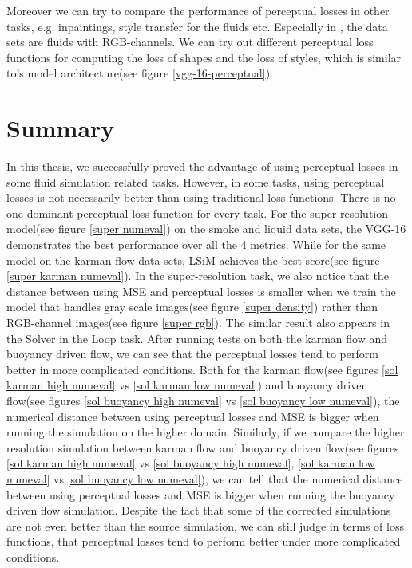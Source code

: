\documentclass[a4paper,12pt,twoside]{report}
\begin{document}
Moreover we can try to compare the performance of perceptual losses in other tasks, e.g. inpaintings\cite{DBLP:journals/corr/abs-1712-03111}, style transfer for the fluids\cite{kim2020lagrangian} etc. Especially in \cite{kim2020lagrangian}, the data sets are fluids with RGB-channels. We can try out different perceptual loss functions for computing the loss of shapes and the loss of styles, which is similar to\cite{johnson2016perceptual}'s model architecture(see figure \ref{vgg-16-perceptual}).
\section{Summary}
In this thesis, we successfully proved the advantage of using perceptual losses in some fluid simulation related tasks. However, in some tasks, using perceptual losses is not necessarily better than using traditional loss functions. There is no one dominant perceptual loss function for every task. For the super-resolution model(see figure \ref{super numeval}) on the smoke and liquid data sets, the VGG-16 demonstrates the best performance over all the 4 metrics. While for the same model on the karman flow data sets, LSiM achieves the best score(see figure \ref{super karman numeval}). 
In the super-resolution task, we also notice that the distance between using MSE and perceptual losses is smaller when we train the model that handles gray scale images(see figure \ref{super density}) rather than RGB-channel images(see figure \ref{super rgb}). The similar result also appears in the Solver in the Loop task. After running tests on both the karman flow and buoyancy driven flow, we can see that the perceptual losses tend to perform better in more complicated conditions. Both for the karman flow(see figures \ref{sol karman high numeval} vs \ref{sol karman low numeval}) and buoyancy driven flow(see figures \ref{sol buoyancy high numeval} vs \ref{sol buoyancy low numeval}), the numerical distance between using perceptual losses and MSE is bigger when running the simulation on the higher domain. Similarly, if we compare the higher resolution simulation between karman flow and buoyancy driven flow(see figures \ref{sol karman high numeval} vs \ref{sol buoyancy high numeval}, \ref{sol karman low numeval} vs \ref{sol buoyancy low numeval}), we can tell that the numerical distance between using perceptual losses and MSE is bigger when running the buoyancy driven flow simulation. Despite the fact that some of the corrected simulations are not even better than the source simulation, we can still judge in terms of loss functions, that perceptual losses tend to perform better under more complicated conditions. 
\end{document}

